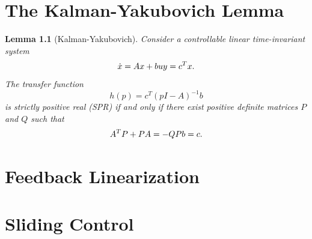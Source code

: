 \documentclass[
]{book}
\newtheorem{lemma}{Lemma}[chapter]
\theoremstyle{definition}
\theoremstyle{definition}
\theoremstyle{definition}
\theoremstyle{definition}
\theoremstyle{remark}
\begin{document}
\hypertarget{the-kalman-yakubovich-lemma}{%
\chapter{The Kalman-Yakubovich Lemma}\label{the-kalman-yakubovich-lemma}}

\begin{lemma}[Kalman-Yakubovich]
\protect\hypertarget{lem:KalmanYakubovich}{}\label{lem:KalmanYakubovich}Consider a controllable linear time-invariant system
\[
\dot{x} = A x + b u \\
y = c^T x.
\]
The transfer function
\[
h(p) = c^T (p I - A)^{-1} b 
\]
is strictly positive real (SPR) if and only if there exist positive definite matrices \(P\) and \(Q\) such that
\[
A^T P + P A = - Q \\
Pb = c.
\]
\end{lemma}

\hypertarget{feedbacklinearization}{%
\chapter{Feedback Linearization}\label{feedbacklinearization}}

\hypertarget{slidingcontrol}{%
\chapter{Sliding Control}\label{slidingcontrol}}

  
\end{document}
